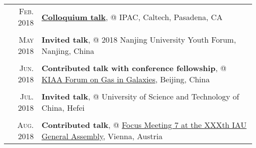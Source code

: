 \documentclass[letterpaper,10pt]{article}
\begin{document}
\begin{longtable}{r|p{5.6in}}
    \textsc{Feb. 2018}   &   \href{https://www.ipac.caltech.edu/event/358}{\textbf{Colloquium talk}}, @ IPAC, Caltech, Pasadena, CA \\
    \multicolumn{2}{c}{} \\

    \textsc{May 2018}   &   \textbf{Invited talk}, @ 2018 Nanjing University Youth Forum, Nanjing, China \\
    \multicolumn{2}{c}{} \\

    \textsc{Jun. 2018}   &   \textbf{Contributed talk with conference fellowship}, @ \href{http://kiaa.pku.edu.cn/gasingalaxies/?q=program}{KIAA Forum on Gas in Galaxies}, Beijing, China \\
    \multicolumn{2}{c}{} \\

    \textsc{Jul. 2018}   &   \textbf{Invited talk}, @ University of Science and Technology of China, Hefei \\
    \multicolumn{2}{c}{} \\

    \textsc{Aug. 2018}   &   \textbf{Contributed talk}, @ \href{http://www.arcetri.astro.it/fm7/programme.html}{Focus Meeting 7 at the XXXth IAU General Assembly}, Vienna, Austria \\

\end{longtable}
\endgroup


\vspace{-1em}
\end{document}
